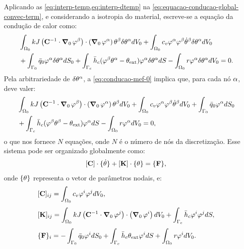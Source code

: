 \documentclass[Tese.tex]{subfiles}
\begin{document}
Aplicando as \cref{eq:interp-temp,eq:interp-dtemp} na \cref{eq:equacao-conducao-global-convec-term}, e considerando a isotropia do material, escreve-se a equação da condução de calor como:
\begin{equation}\label{eq:conducao-mef-0}
\begin{aligned}
&\int_{\Omega_0}kJ\left(\mathbf{C}^{-1}\cdot\boldsymbol{\nabla}_0\,\varphi^\beta\right)\cdot\left(\boldsymbol{\nabla}_0\,\varphi^\alpha\right)\theta^\beta\delta\theta^\alpha dV_0 + \int_{\Omega_0}c_v\varphi^\alpha\varphi^\beta\dot{\theta}^\beta\delta\theta^\alpha dV_0 \\&+ \int_{\Gamma_0}\bar{q}_0\varphi^\alpha\delta\theta^\alpha dS_0  + \int_{\Gamma_{c}}\bar{h}_c(\varphi^\beta\theta^\alpha-\theta_\text{ext})\varphi^\alpha\delta\theta^\alpha dS - \int_{\Omega_0} r\varphi^\alpha\delta\theta^\alpha dV_0  = 0.
\end{aligned}
\end{equation}
Pela arbitrariedade de $\delta\theta^\alpha$, a \cref{eq:conducao-mef-0} implica que, para cada nó $\alpha$, deve valer:
\begin{equation}\label{eq:conducao-mef-1}
\begin{aligned}
&\int_{\Omega_0}kJ\left(\mathbf{C}^{-1}\cdot\boldsymbol{\nabla}_0\,\varphi^\beta\right)\cdot\left(\boldsymbol{\nabla}_0\,\varphi^\alpha\right)\theta^\beta dV_0 + \int_{\Omega_0}c_v\varphi^\alpha\varphi^\beta\dot{\theta}^\beta dV_0 + \int_{\Gamma_0}\bar{q}_0\varphi^\alpha dS_0\\&  + \int_{\Gamma_{c}}\bar{h}_c(\varphi^\beta\theta^\beta-\theta_\text{ext})\varphi^\alpha dS - \int_{\Omega_0} r\varphi^\alpha dV_0  = 0,
\end{aligned}
\end{equation}
o que nos fornece $N$ equações, onde $N$ é o número de nós da discretização. Esse sistema pode ser organizado globalmente como:
\begin{equation}\label{eq:sistema-termo-0}
[\mathbf{C}]\cdot\{\dot{\theta}\} + [\mathbf{K}]\cdot\{\theta\} = \{\mathbf{F}\} ,
\end{equation}
onde $\{\theta\}$ representa o vetor de parâmetros nodais, e:
\begin{align}
&[\mathbf{C}]_{ij} = \int_{\Omega_0}c_v\varphi^i\varphi^j dV_0, \label{eq:matC}\\[0.1cm]
&[\mathbf{K}]_{ij} = \int_{\Omega_0}kJ\left(\mathbf{C}^{-1}\cdot\boldsymbol{\nabla}_0\,\varphi^j\right)\cdot\left(\boldsymbol{\nabla}_0\,\varphi^i\right) dV_0 + \int_{\Gamma_{c}}\bar{h}_c\varphi^i\varphi^j dS, \label{eq:matK} \\[0.1cm]
&\{\mathbf{F}\}_{i} = -\int_{\Gamma_0}\bar{q}_0\varphi^i dS_0 + \int_{\Gamma_{c}}\bar{h}_c\theta_\text{ext}\varphi^i dS + \int_{\Omega_0} r\varphi^i dV_0. \label{eq:vetF}
\end{align}
\end{document}
